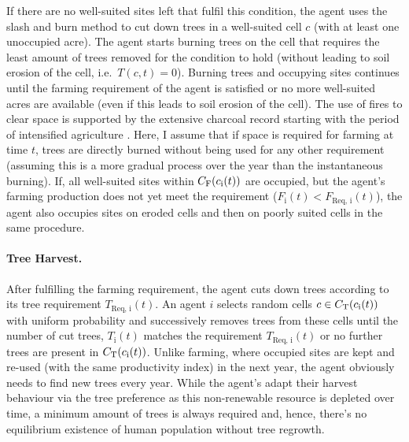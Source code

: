 If there are no well-suited sites left that fulfil this condition, the agent uses the slash and burn method to cut down trees in a well-suited cell $c$ (with at least one unoccupied acre).
The agent starts burning trees on the cell that requires the least amount of trees removed for the condition to hold (without leading to soil erosion of the cell, i.e.\ $T(c,t)=0$).
Burning trees and occupying sites continues until the farming requirement of the agent is satisfied or no more well-suited acres are available (even if this leads to soil erosion of the cell).
The use of fires to clear space is supported by the extensive charcoal record starting with the period of intensified agriculture \citep{Mieth2015}. 
Here, I assume that if space is required for farming at time $t$, 
trees are directly burned without being used for any other requirement (assuming this is a more gradual process over the year than the instantaneous burning).
If, all well-suited sites within $C_{\rm F}(c_{\rm i}(t))$ are occupied, but the agent's farming production does not yet meet the requirement ($F_\text{i}(t)<F_\text{Req, i}(t)$), the agent also occupies sites on eroded cells and then on poorly suited cells in the same procedure.

\paragraph{Tree Harvest.}
After fulfilling the farming requirement, the agent cuts down trees according to its tree requirement $T_\text{Req, i}(t)$.
An agent $i$ selects random cells $c\in C_{\rm T}(c_{\rm i}(t))$ with uniform probability and successively removes trees from these cells until the number of cut trees, $T_\text{i}(t)$ matches the requirement $T_\text{Req, i}(t)$ or no further trees are present in $ C_{\rm T}(c_{\rm i}(t))$. 
Unlike farming, where occupied sites are kept and re-used (with the same productivity index) in the next year, the agent obviously needs to find new trees every year.
While the agent's adapt their harvest behaviour via the tree preference as this non-renewable resource is depleted over time, a minimum amount of trees is always required and, hence, there's no equilibrium existence of human population without tree regrowth.

